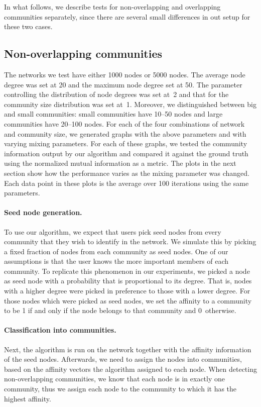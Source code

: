 In what follows, we describe tests for non-overlapping and overlapping communities separately, since 
there are several small differences in out setup for these two cases. 

\subsection{Non-overlapping communities}
The networks we test have either 1000 nodes or 5000 nodes. The average node degree
was set at 20 and the maximum node degree set at 50. The parameter controlling the 
distribution of node degrees was set at~2 and that for the community size distribution was 
set at~1. Moreover, we distinguished between big and small communities: small communities have 
10--50 nodes and large communities have 20--100 nodes. 
For each of the four combinations of network and community size, we generated graphs with the 
above parameters and with varying mixing parameters. For each of these graphs, we tested the 
community information output by our algorithm and compared it against the ground truth 
using the normalized mutual information as a metric. The plots in the next section 
show how the performance varies as the mixing parameter was changed. Each data point in 
these plots is the average over 100 iterations using the same parameters. 

\paragraph{Seed node generation.} 
To use our algorithm, we expect that users pick seed nodes from 
every community that they wish to identify in the network. 
We simulate this by picking a fixed fraction of nodes from each community as seed nodes.
One of our assumptions is that the user knows the more important members of each community. 
To replicate this phenomenon in our experiments, we picked a node as seed node
with a probability that is proportional to its degree.
That is, nodes with a higher degree were picked in preference to those with a lower degree.
For those nodes which were picked as seed nodes, we set the affinity to a community to be 1 if 
and only if the node belongs to that community and 0~otherwise.

\paragraph{Classification into communities.}
Next, the algorithm is run on the network together with the affinity information of the seed nodes.
Afterwards, we need to assign the nodes into communities, 
based on the affinity vectors the algorithm assigned to each node.
When detecting non-overlapping communities, we know that each node is in exactly one community,
thus we assign each node to the community to which it has the highest affinity.


